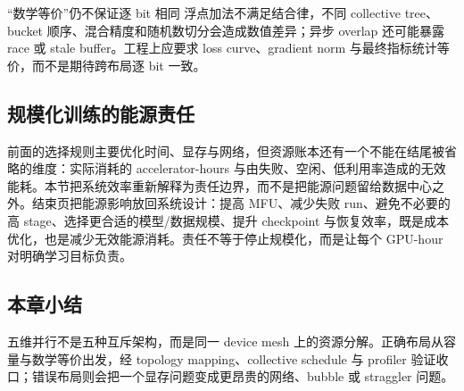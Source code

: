 \begin{warningbox}{“数学等价”仍不保证逐 bit 相同}
浮点加法不满足结合律，不同 collective tree、bucket 顺序、混合精度和随机数切分会造成数值差异；异步 overlap 还可能暴露 race 或 stale buffer。工程上应要求 loss curve、gradient norm 与最终指标统计等价，而不是期待跨布局逐 bit 一致。
\end{warningbox}

\subsection{规模化训练的能源责任}

前面的选择规则主要优化时间、显存与网络，但资源账本还有一个不能在结尾被省略的维度：实际消耗的 accelerator-hours 与由失败、空闲、低利用率造成的无效能耗。本节把系统效率重新解释为责任边界，而不是把能源问题留给数据中心之外。结束页把能源影响放回系统设计：提高 MFU、减少失败 run、避免不必要的高 stage、选择更合适的模型/数据规模、提升 checkpoint 与恢复效率，既是成本优化，也是减少无效能源消耗。责任不等于停止规模化，而是让每个 GPU-hour 对明确学习目标负责。


\subsection{本章小结}

五维并行不是五种互斥架构，而是同一 device mesh 上的资源分解。正确布局从容量与数学等价出发，经 topology mapping、collective schedule 与 profiler 验证收口；错误布局则会把一个显存问题变成更昂贵的网络、bubble 或 straggler 问题。

